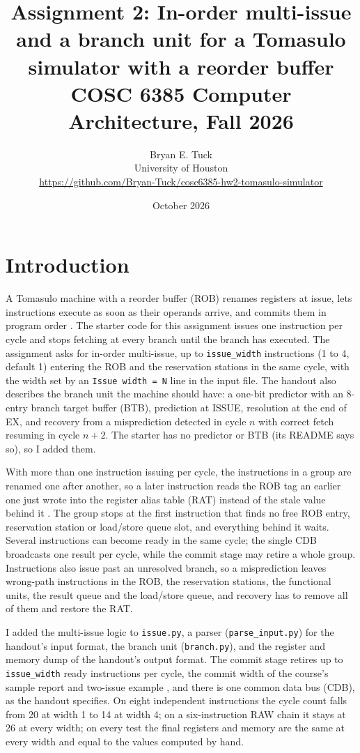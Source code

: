 \documentclass[11pt]{article}
\title{Assignment 2: In-order multi-issue and a branch unit for a Tomasulo simulator with a reorder buffer\\
  \large COSC 6385 Computer Architecture, Fall 2026}
\author{Bryan E. Tuck\\University of Houston\\{\small \url{https://github.com/Bryan-Tuck/cosc6385-hw2-tomasulo-simulator}}}
\date{October 2026}
\newcommand{\code}[1]{\texttt{#1}}
\begin{document}
\maketitle

\section{Introduction}

A Tomasulo machine with a reorder buffer (ROB) renames registers at issue, lets instructions
execute as soon as their operands arrive, and commits them in program order \cite{lec8,lec9}.
The starter code for this assignment \cite{assignment} issues one instruction per cycle and
stops fetching at every branch until the branch has executed. The assignment asks for in-order multi-issue, up to \code{issue\_width}
instructions (1 to 4, default 1) entering the ROB and the reservation stations in the same
cycle, with the width set by an \code{Issue width = N} line in the input file. The handout
also describes the branch unit the machine should have: a one-bit predictor with an 8-entry
branch target buffer (BTB), prediction at ISSUE, resolution at the end of EX, and recovery
from a misprediction detected in cycle $n$ with correct fetch resuming in cycle $n+2$. The
starter has no predictor or BTB (its README says so), so I added them.

With more than one instruction issuing per cycle, the instructions in a group are
renamed one after another, so a later instruction reads the ROB tag an earlier one just
wrote into the register alias table (RAT) instead of the stale value behind it
\cite[slide~13, ``Intra-group dependencies'']{lec9}. The group stops at the first
instruction that finds no free ROB entry, reservation station or load/store queue slot, and
everything behind it waits. Several instructions can become ready in the same cycle;
the single CDB broadcasts one result per cycle, while the commit stage may retire a whole
group. Instructions also issue past an unresolved branch, so a misprediction leaves
wrong-path instructions in the ROB, the reservation stations, the functional units, the
result queue and the load/store queue, and recovery has to remove all of them and
restore the RAT.

I added the multi-issue logic to \code{issue.py}, a parser (\code{parse\_input.py}) for
the handout's input format, the branch unit (\code{branch.py}), and the register and memory
dump of the handout's output format. The commit stage retires up to \code{issue\_width}
ready instructions per cycle, the commit width of the course's sample report and two-issue
example \cite{sample,oooexample}, and there is one common data bus (CDB), as the handout
specifies. On eight independent
instructions the cycle count falls from 20 at width 1 to 14 at width 4; on a six-instruction
RAW chain it stays at 26 at every width; on every test the final registers and memory are
the same at every width and equal to the values computed by hand.
\end{document}
